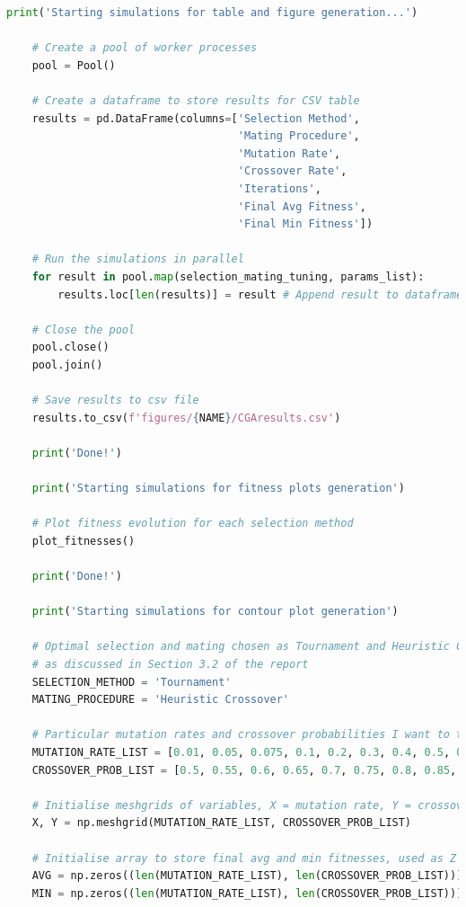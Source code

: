 \documentclass[10pt]{article}
\begin{document}
\begin{lstlisting}[language=Python, caption=CGA\_TuningExperiments.py, label=CGA_TuningExperimentspy]
    print('Starting simulations for table and figure generation...')
    
    # Create a pool of worker processes
    pool = Pool()
    
    # Create a dataframe to store results for CSV table
    results = pd.DataFrame(columns=['Selection Method', 
                                    'Mating Procedure', 
                                    'Mutation Rate', 
                                    'Crossover Rate', 
                                    'Iterations', 
                                    'Final Avg Fitness', 
                                    'Final Min Fitness'])
    
    # Run the simulations in parallel
    for result in pool.map(selection_mating_tuning, params_list):
        results.loc[len(results)] = result # Append result to dataframe
    
    # Close the pool
    pool.close()
    pool.join()
    
    # Save results to csv file
    results.to_csv(f'figures/{NAME}/CGAresults.csv')
    
    print('Done!')
    
    print('Starting simulations for fitness plots generation')
    
    # Plot fitness evolution for each selection method
    plot_fitnesses()
    
    print('Done!')
    
    print('Starting simulations for contour plot generation')
    
    # Optimal selection and mating chosen as Tournament and Heuristic Crossover respectively 
    # as discussed in Section 3.2 of the report
    SELECTION_METHOD = 'Tournament'
    MATING_PROCEDURE = 'Heuristic Crossover'
    
    # Particular mutation rates and crossover probabilities I want to test
    MUTATION_RATE_LIST = [0.01, 0.05, 0.075, 0.1, 0.2, 0.3, 0.4, 0.5, 0.6, 0.7]
    CROSSOVER_PROB_LIST = [0.5, 0.55, 0.6, 0.65, 0.7, 0.75, 0.8, 0.85, 0.9, 0.95]
    
    # Initialise meshgrids of variables, X = mutation rate, Y = crossover probability
    X, Y = np.meshgrid(MUTATION_RATE_LIST, CROSSOVER_PROB_LIST)
    
    # Initialise array to store final avg and min fitnesses, used as Z in heat maps
    AVG = np.zeros((len(MUTATION_RATE_LIST), len(CROSSOVER_PROB_LIST)))
    MIN = np.zeros((len(MUTATION_RATE_LIST), len(CROSSOVER_PROB_LIST)))
    

\end{lstlisting}
\end{document}
